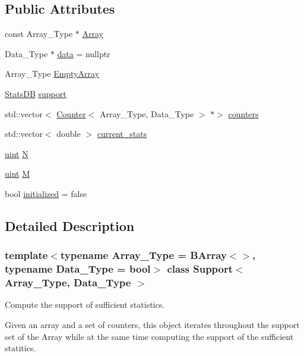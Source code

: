 \subsection*{Public Attributes}
\begin{DoxyCompactItemize}
\item 
const Array\+\_\+\+Type $\ast$ \hyperlink{class_support_a73f1375ad76be291f9f3768e9d6f912c}{Array}
\item 
Data\+\_\+\+Type $\ast$ \hyperlink{class_support_ad185d111ea5ea3bfe16cf458a36efc63}{data} = nullptr
\item 
Array\+\_\+\+Type \hyperlink{class_support_a9364028f9966697e3cdd3fc6a5cd90de}{Empty\+Array}
\item 
\hyperlink{class_stats_d_b}{Stats\+DB} \hyperlink{class_support_ab2f404c7c11d5bc58e876124cc52d073}{support}
\item 
std\+::vector$<$ \hyperlink{class_counter}{Counter}$<$ Array\+\_\+\+Type, Data\+\_\+\+Type $>$ $\ast$$>$ \hyperlink{class_support_a650201174421779897fbea8fa4dc766e}{counters}
\item 
std\+::vector$<$ double $>$ \hyperlink{class_support_ada67557033378742f8592a96f39d1127}{current\+\_\+stats}
\item 
\hyperlink{typedefs_8hpp_a91ad9478d81a7aaf2593e8d9c3d06a14}{uint} \hyperlink{class_support_ab15c7125d6b99ae15ec4dbb34c9ce9b6}{N}
\item 
\hyperlink{typedefs_8hpp_a91ad9478d81a7aaf2593e8d9c3d06a14}{uint} \hyperlink{class_support_ace1d46b871c67caa774ac2269930e97f}{M}
\item 
bool \hyperlink{class_support_ac352c6473720fcdcd9895c48bd872ef5}{initialized} = false
\end{DoxyCompactItemize}


\subsection{Detailed Description}
\subsubsection*{template$<$typename Array\+\_\+\+Type = B\+Array$<$$>$, typename Data\+\_\+\+Type = bool$>$\newline
class Support$<$ Array\+\_\+\+Type, Data\+\_\+\+Type $>$}

Compute the support of sufficient statistics. 

Given an array and a set of counters, this object iterates throughout the support set of the Array while at the same time computing the support of the sufficient statitics. 

